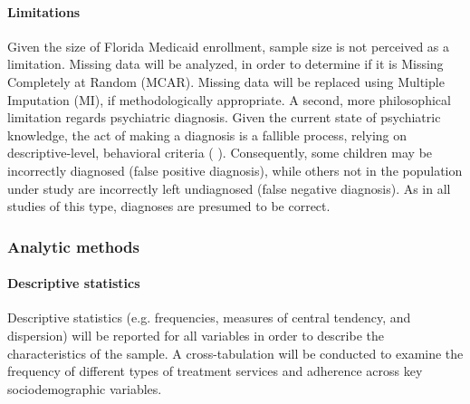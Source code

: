 \documentclass[twocolumn, issue, rga, authordate]{jote-new-article}
\begin{document}
\paragraph{Limitations} Given the size of Florida Medicaid enrollment,
sample size is not perceived as a limitation. Missing data will be
analyzed, in order to determine if it is Missing Completely at Random
(MCAR). Missing data will be replaced using Multiple Imputation (MI), if
methodologically appropriate. A second, more philosophical limitation
regards psychiatric diagnosis. Given the current state of psychiatric
knowledge, the act of making a diagnosis is a fallible process, relying
on descriptive-level, behavioral criteria ( \citeyear{Regier2013}).
Consequently, some children may be incorrectly diagnosed (false positive
diagnosis), while others not in the population under study are
incorrectly left undiagnosed (false negative diagnosis). As in all
studies of this type, diagnoses are presumed to be correct.


\subsubsection{Analytic methods}


\paragraph{Descriptive statistics} Descriptive statistics (e.g.
frequencies, measures of central tendency, and dispersion) will be
reported for all variables in order to describe the characteristics of
the sample. A cross-tabulation will be conducted to examine the
frequency of different types of treatment services and adherence across
key sociodemographic variables.
\end{document}
